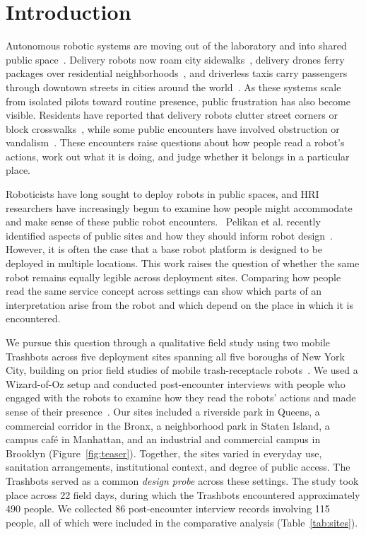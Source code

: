 \section{Introduction}

Autonomous robotic systems are moving out of the laboratory and into shared public space~\cite{jung2018robots, pelikan2024encountering}. Delivery robots now roam city sidewalks~\cite{starship2025, yu2024understanding}, delivery drones ferry packages over residential neighborhoods~\cite{faa2025drone}, and driverless taxis carry passengers through downtown streets in cities around the world~\cite{waymo2025rides}. As these systems scale from isolated pilots toward routine presence, public frustration has also become visible. Residents have reported that delivery robots clutter street corners or block crosswalks~\cite{han2024codesign, yu2024understanding}, while some public encounters have involved obstruction or vandalism~\cite{sfstandard2024waymo, brscic2015escaping}. These encounters raise questions about how people read a robot's actions, work out what it is doing, and judge whether it belongs in a particular place.

Roboticists have long sought to deploy robots in public spaces, and HRI researchers have increasingly begun to examine how people might accommodate and make sense of these public robot encounters.~\cite{pelikan2024encountering,ekman2026sharing,bu2025making,weiss2010robots,jensen2005robots, thrun2000interaction} 
Pelikan et al. recently identified aspects of public sites and how they should inform robot design~\cite{pelikan2025localism}. However, it is often the case that a base robot platform is designed to be deployed in multiple locations. This work raises the question of whether the same robot remains equally legible across deployment sites. Comparing how people read the same service concept across settings can show which parts of an interpretation arise from the robot and which depend on the place in which it is encountered.

We pursue this question through a qualitative field study using two mobile Trashbots across five deployment sites spanning all five boroughs of New York City, building on prior field studies of mobile trash-receptacle robots~\cite{bu2024field}. We used a Wizard-of-Oz setup and conducted post-encounter interviews with people who engaged with the robots to examine how they read the robots' actions and made sense of their presence~\cite{bu2025making}. Our sites included a riverside park in Queens, a commercial corridor in the Bronx, a neighborhood park in Staten Island, a campus caf\'e in Manhattan, and an industrial and commercial campus in Brooklyn (Figure~\ref{fig:teaser}). Together, the sites varied in everyday use, sanitation arrangements, institutional context, and degree of public access. The Trashbots served as a common \emph{design probe}\cite{boehner201214} across these settings. The study took place across 22 field days, during which the Trashbots encountered approximately 490 people. We collected 86 post-encounter interview records involving 115 people, all of which were included in the comparative analysis (Table~\ref{tab:sites}).

